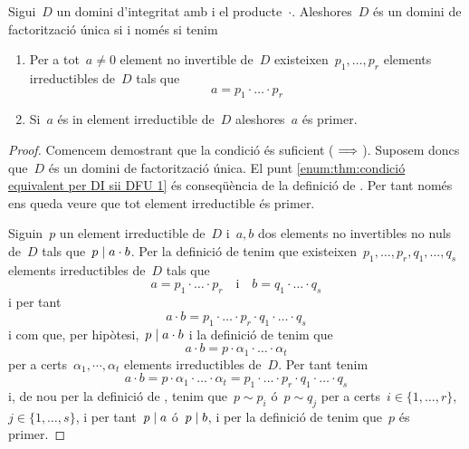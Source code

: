 \documentclass[../../main.tex]{subfiles}
\begin{document}
    \begin{theorem}
        \label{thm:condició equivalent per DI sii DFU}
        Sigui~\(D\) un domini d'integritat amb i el producte~\(\cdot\).
        Aleshores~\(D\) és un domini de factorització única si i només si tenim
        \begin{enumerate}
            \item\label{enum:thm:condició equivalent per DI sii DFU 1} Per a tot~\(a\neq0\) element no invertible de~\(D\) existeixen~\(p_{1},\dots,p_{r}\) elements irreductibles de~\(D\) tals que
            \[
                a=p_{1}\cdot\ldots\cdot p_{r}
            \]
            \item\label{enum:thm:condició equivalent per DI sii DFU 2} Si~\(a\) és in element irreductible de~\(D\) aleshores~\(a\) és primer.
        \end{enumerate}
        \begin{proof}
            Comencem demostrant que la condició és suficient (\(\implies\)).
            Suposem doncs que~\(D\) és un domini de factorització única.
            El punt \eqref{enum:thm:condició equivalent per DI sii DFU 1} és conseqüència de la definició de .
            Per tant només ens queda veure que tot element irreductible és primer.

            Siguin~\(p\) un element irreductible de~\(D\) i~\(a,b\) dos elements no invertibles no nuls de~\(D\) tals que~\(p\mathrel{|} a\cdot b\).
            Per la definició de  tenim que existeixen~\(p_{1},\dots,p_{r},q_{1},\dots,q_{s}\) elements irreductibles de~\(D\) tals que
            \[
                a=p_{1}\cdot\ldots\cdot p_{r}\quad\text{i}\quad b=q_{1}\cdot\ldots\cdot q_{s}
            \]
            i per tant
            \[
                a\cdot b=p_{1}\cdot\ldots\cdot p_{r}\cdot q_{1}\cdot\ldots\cdot q_{s}
            \]
            i com que, per hipòtesi,~\(p\mathrel{|} a\cdot b\) i la definició de  tenim que
            \[
                a\cdot b=p\cdot\alpha_{1}\cdot\ldots\cdot\alpha_{t}
            \]
            per a certs~\(\alpha_{1},\cdots,\alpha_{t}\) elements irreductibles de~\(D\).
            Per tant tenim
            \[
                a\cdot b=p\cdot\alpha_{1}\cdot\ldots\cdot\alpha_{t}=p_{1}\cdot\ldots\cdot p_{r}\cdot q_{1}\cdot\ldots\cdot q_{s}
            \]
            i, de nou per la definició de , tenim que~\(p\sim p_{i}\) ó~\(p\sim q_{j}\) per a certs~\(i\in\{1,\dots,r\}\),~\(j\in\{1,\dots,s\}\), i per tant~\(p\mathrel{|} a\) ó~\(p\mathrel{|} b\), i per la definició de  tenim que~\(p\) és primer.


\end{proof}
\end{theorem}
\end{document}
